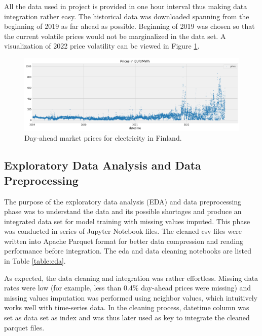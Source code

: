 \documentclass{article}
\begin{document}
All the data used in project is provided in one hour interval thus making data integration rather easy. The historical data was downloaded spanning from the beginning of 2019 as far ahead as possible. Beginning of 2019 was chosen so that the current volatile prices would not be marginalized in the data set. A visualization of 2022 price volatility can be viewed in Figure \ref{fig:prices-history}.

\begin{figure}[ht] 
\centering
\includegraphics[width=\textwidth]{report/images/day-ahead-prices.png}
\caption{Day-ahead market prices for electricity in Finland.}
\label{fig:prices-history} 
\end{figure}

\subsection{Exploratory Data Analysis and Data Preprocessing}
\label{subsection:eda}

The purpose of the exploratory data analysis (EDA) and data preprocessing phase was to understand the data and its possible shortages and produce an integrated data set for model training with missing values imputed. This phase was conducted in series of Jupyter Notebook files. The cleaned csv files were written into Apache Parquet format for better data compression and reading performance before integration. The eda and data cleaning notebooks are listed in Table \ref{table:eda}.

As expected, the data cleaning and integration was rather effortless. Missing data rates were low (for example, less than 0.4\% day-ahead prices were missing) and missing values imputation was performed using neighbor values, which intuitively works well with time-series data. In the cleaning process, datetime column was set as data set as index and was thus later used as key to integrate the cleaned parquet files.
\end{document}

